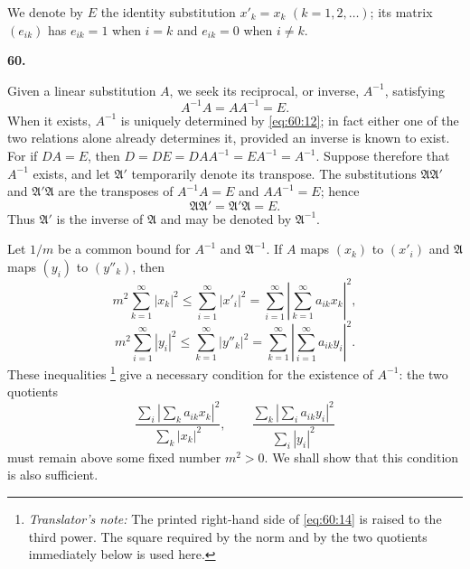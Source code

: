 \documentclass[
  paper=b5,
  fontsize=13pt,
  twoside=true,
  open=any,
  bookmarkpackage=false,
  chapterprefix=true,
  headings=normal
]{scrbook}
\theoremstyle{definition}
\newcommand{\numberedparagraph}[1]{%
  \par\medskip\phantomsection\label{sec:#1}%
  \noindent\textbf{#1.}\enspace
}
\newcounter{translatornote}
\newcommand{\translatornotelabel}{T\arabic{translatornote}}
\newcommand{\translatornote}[1]{%
  \stepcounter{translatornote}%
  \begingroup
    \edef\savedfootnotenumber{\number\value{footnote}}%
    \renewcommand{\thefootnote}{\translatornotelabel}%
    \footnote{\emph{Translator's note:} #1}%
    \setcounter{footnote}{\savedfootnotenumber}%
  \endgroup
}
\begin{document}
We denote by $E$ the identity substitution
$x'_k=x_k$ $(k=1,2,\ldots)$; its matrix $(e_{ik})$ has $e_{ik}=1$ when
$i=k$ and $e_{ik}=0$ when $i\neq k$.

\numberedparagraph{60}
Given a linear substitution $A$, we seek its reciprocal, or inverse,
$A^{-1}$, satisfying
\begin{equation}
  A^{-1}A=AA^{-1}=E.
  \tag{12}\label{eq:60:12}
\end{equation}
When it exists, $A^{-1}$ is uniquely determined by \eqref{eq:60:12}; in
fact either one of the two relations alone already determines it, provided
an inverse is known to exist.
For if $D A=E$, then
$D=DE=DAA^{-1}=EA^{-1}=A^{-1}$. Suppose therefore that $A^{-1}$ exists,
and let $\mathfrak A'$ temporarily denote its transpose. The substitutions
$\mathfrak A\mathfrak A'$ and $\mathfrak A'\mathfrak A$ are the transposes
of $A^{-1}A=E$ and $AA^{-1}=E$; hence
\[
  \mathfrak A\mathfrak A'=\mathfrak A'\mathfrak A=E.
\]
Thus $\mathfrak A'$ is the inverse of $\mathfrak A$ and may be denoted by
$\mathfrak A^{-1}$.

Let $1/m$ be a common bound for $A^{-1}$ and $\mathfrak A^{-1}$. If $A$
maps $(x_k)$ to $(x'_i)$ and $\mathfrak A$ maps $(y_i)$ to $(y''_k)$, then
\begin{equation}
  m^2\sum_{k=1}^{\infty}|x_k|^2
  \leq\sum_{i=1}^{\infty}|x'_i|^2
  =\sum_{i=1}^{\infty}
    \left|\sum_{k=1}^{\infty}a_{ik}x_k\right|^2,
  \tag{13}\label{eq:60:13}
\end{equation}
\begin{equation}
  m^2\sum_{i=1}^{\infty}|y_i|^2
  \leq\sum_{k=1}^{\infty}|y''_k|^2
  =\sum_{k=1}^{\infty}
    \left|\sum_{i=1}^{\infty}a_{ik}y_i\right|^2.
  \tag{14}\label{eq:60:14}
\end{equation}
These inequalities\translatornote{The printed right-hand side of
\eqref{eq:60:14} is raised to the third power. The square required by the
norm and by the two quotients immediately below is used here.} give a
necessary condition for the existence of
$A^{-1}$: the two quotients
\[
  \frac{\displaystyle\sum_i\left|\sum_k a_{ik}x_k\right|^2}
       {\displaystyle\sum_k|x_k|^2},
  \qquad
  \frac{\displaystyle\sum_k\left|\sum_i a_{ik}y_i\right|^2}
       {\displaystyle\sum_i|y_i|^2}
\]
must remain above some fixed number $m^2>0$. We shall show that this condition
is also sufficient.
\end{document}
